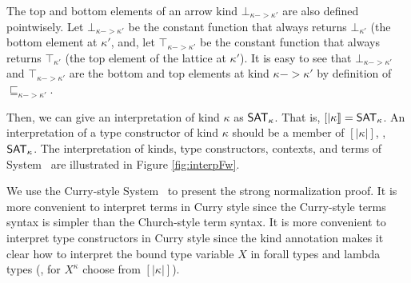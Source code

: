The top and bottom elements of an arrow kind $\bot_{\kappa -> \kappa'}$
are also defined pointwisely. Let $\bot_{\kappa -> \kappa'}$ be
the constant function that always returns $\bot_{\kappa'}$
(the bottom element at $\kappa'$, and, let $\top_{\kappa -> \kappa'}$ be
the constant function that always returns $\top_{\kappa'}$
(the top element of the lattice at $\kappa'$). It is easy to see that
$\bot_{\kappa -> \kappa'}$ and $\top_{\kappa -> \kappa'}$
are the bottom and top elements at kind $\kappa -> \kappa'$
by definition of $\sqsubseteq_{\kappa -> \kappa'}$.

Then, we can give an interpretation of kind $\kappa$ as $\mathsf{SAT}_\kappa$.
That is, $[| \kappa |] = \mathsf{SAT}_\kappa$. An interpretation of a type constructor
of kind $\kappa$ should be a member of $[| \kappa |]$, \ie, $\mathsf{SAT}_\kappa$.
The interpretation of kinds, type constructors, contexts, and
terms of System \Fw\ are illustrated in Figure \ref{fig:interpFw}. 

We use the Curry-style System \Fw\ to present the strong normalization
proof. It is more convenient to interpret terms in Curry style since
the Curry-style terms syntax is simpler than the Church-style term syntax.
It is more convenient to interpret type constructors in Curry style since
the kind annotation makes it clear how to interpret the bound type variable $X$
in forall types and lambda types (\ie, for $X^\kappa$ choose from $[|\kappa|]$).

